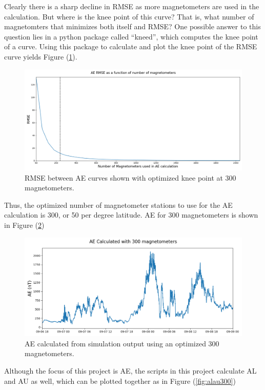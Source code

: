 \documentclass[12pt, letterpaper]{article}
\begin{document}
Clearly there is a sharp decline in RMSE as more magnetometers are used in the calculation. But where is the knee point of this curve? That is, what number of magnetomters that minimizes both itself and RMSE? One possible answer to this question lies in a python package called ``kneed'', which computes the knee point of a curve. Using this package to calculate and plot the knee point of the RMSE curve yields Figure (\ref{fig:rmseKnee}).

\begin{figure}[!ht]
  \centering
  \includegraphics[width=14cm]{../ae_plots_LaTeX/rmse_v_num_mags_vline.png}
  \caption{RMSE between AE curves shown with optimized knee point at 300 magnetometers.}
  \label{fig:rmseKnee}
\end{figure}

Thus, the optimized number of magnetometer stations to use for the AE calculation is 300, or 50 per degree latitude. AE for 300 magnetometers is shown in Figure (\ref{fig:ae300})

\begin{figure}[!ht]
  \centering
  \includegraphics[width=14cm]{../ae_plots_LaTeX/ae_300.png}
  \caption{AE calculated from simulation output using an optimized 300 magnetometers.}
  \label{fig:ae300}
\end{figure}

Although the focus of this project is AE, the scripts in this project calculate AL and AU as well, which can be plotted together as in Figure (\ref{fig:alau300})
\end{document}
